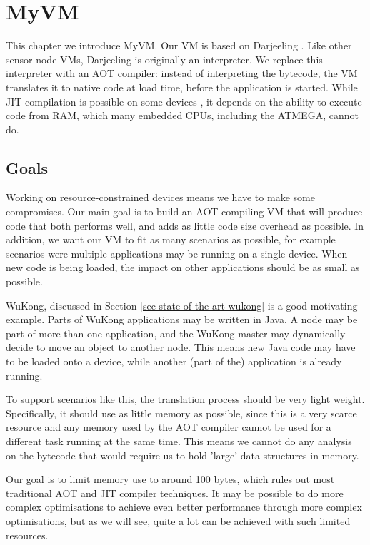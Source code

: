 \chapter{MyVM}

This chapter we introduce MyVM. Our VM is based on Darjeeling \cite{Brouwers:2009cj}. Like other sensor node VMs, Darjeeling is originally an interpreter. We replace this interpreter with an AOT compiler: instead of interpreting the bytecode, the VM translates it to native code at load time, before the application is started. While JIT compilation is possible on some devices \cite{Ellul:2012thesis}, it depends on the ability to execute code from RAM, which many embedded CPUs, including the ATMEGA, cannot do.



\section{Goals}
Working on resource-constrained devices means we have to make some compromises. Our main goal is to build an AOT compiling VM that will produce code that both performs well, and adds as little code size overhead as possible. In addition, we want our VM to fit as many scenarios as possible, for example scenarios were multiple applications may be running on a single device. When new code is being loaded, the impact on other applications should be as small as possible.

WuKong, discussed in Section \ref{sec-state-of-the-art-wukong} is a good motivating example. Parts of WuKong applications may be written in Java. A node may be part of more than one application, and the WuKong master may dynamically decide to move an object to another node. This means new Java code may have to be loaded onto a device, while another (part of the) application is already running.

To support scenarios like this, the translation process should be very light weight. Specifically, it	 should use as little memory as possible, since this is a very scarce resource and any memory used by the AOT compiler cannot be used for a different task running at the same time. This means we cannot do any analysis on the bytecode that would require us to hold 'large' data structures in memory.

Our goal is to limit memory use to around 100 bytes, which rules out most traditional AOT and JIT compiler techniques. It may be possible to do more complex optimisations to achieve even better performance through more complex optimisations, but as we will see, quite a lot can be achieved with such limited resources.

